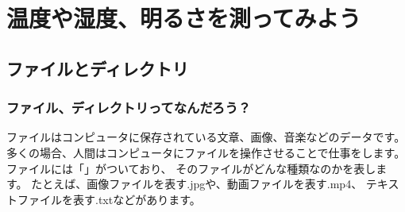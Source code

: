 \chapter{温度や湿度、明るさを測ってみよう}
\section{ファイルとディレクトリ}
\subsection{ファイル、ディレクトリってなんだろう？}
ファイルはコンピュータに保存されている文章、画像、音楽などのデータです。
多くの場合、人間はコンピュータにファイルを操作させることで仕事をします。
ファイルには「」がついており、
そのファイルがどんな種類なのかを表します。
たとえば、画像ファイルを表す.jpgや、動画ファイルを表す.mp4、
テキストファイルを表す.txtなどがあります。

